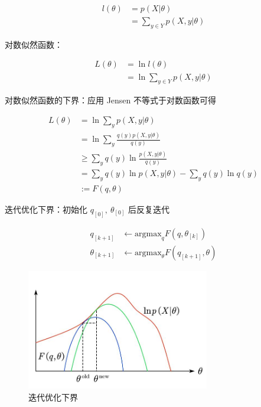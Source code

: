 \documentclass[openany,a4paper,12pt]{ctexbook}
\theoremstyle{kaiti}
\theoremstyle{normal}
\begin{document}
\begin{equation}
\begin{aligned}
  l(\theta)
  &=p(X|\theta)\\
  &=\sum_{y\in Y}p\left(X,y|\theta \right)
\end{aligned}
\end{equation}

对数似然函数：

\begin{equation}
\begin{aligned}
  L(\theta)
  &=\ln l(\theta)\\
  &=\ln \sum_{y\in Y}p\left(X,y|\theta \right)
\end{aligned}
\end{equation}

对数似然函数的下界：应用 Jensen 不等式于对数函数可得

\begin{equation}
\begin{aligned}
  L(\theta)
  &=\ln \sum_yp\left(X,y|\theta \right)\\
  &=\ln \sum_y\frac{q(y)p\left(X,y|\theta \right)}{q(y)}\\
  &\geqslant \sum_yq(y)\ln\frac{p\left(X,y|\theta \right)}{q(y)} \\
  &=\sum_yq(y)\ln p\left(X,y|\theta \right)-\sum_yq(y)\ln q(y)\\
  &:=F\left(q,\theta \right)
\end{aligned}
\end{equation}

迭代优化下界：初始化 $q_{\left[0 \right]},~\theta_{\left[0 \right]}$ 后反复迭代

\begin{equation}
\begin{aligned}
  q_{\left[k+1 \right]}&\gets \mathrm{argmax}_qF\left(q,\theta_{\left[k \right]} \right)\\
  \theta_{\left[k+1 \right]}&\gets \mathrm{argmax}_{\theta}F\left(q_{\left[k+1 \right]},\theta \right)
\end{aligned}
\end{equation}

\begin{figure}
  \centering
  \includegraphics[width=8cm]{1627808293080-3.1.jpg}
  \caption{迭代优化下界}
\end{figure}
\end{document}
